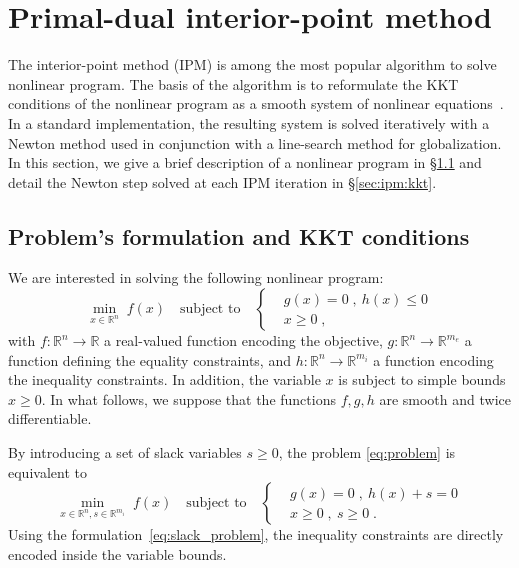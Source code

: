 \section{Primal-dual interior-point method}
The interior-point method (IPM) is among the most popular algorithm
to solve nonlinear program. The basis of the algorithm is to
reformulate the KKT conditions of the nonlinear program as a smooth
system of nonlinear equations~\cite{nocedal_numerical_2006}. In a standard implementation, the
resulting system is solved iteratively with a Newton method used in conjunction
with a line-search method for globalization. In this section, we
give a brief description of a nonlinear program in \S\ref{sec:ipm:problem}
and detail the Newton step solved at each IPM iteration in \S\ref{sec:ipm:kkt}.

\subsection{Problem's formulation and KKT conditions}
\label{sec:ipm:problem}
We are interested in solving the following nonlinear program:
\begin{equation}
  \label{eq:problem}
    \min_{x \in \mathbb{R}^n} \;  f(x)
\quad \text{subject to}\quad
\left\{
  \begin{aligned}
    & g(x) = 0 \; , ~ h(x) \leq 0 \\
      & x \geq 0  \; ,
  \end{aligned}
\right.
\end{equation}
with $f:\mathbb{R}^n \to \mathbb{R}$ a real-valued function
encoding the objective, $g: \mathbb{R}^n \to \mathbb{R}^{m_e}$
a function defining the equality constraints, and $h: \mathbb{R}^{n} \to
\mathbb{R}^{m_i}$ a function encoding the inequality constraints.
In addition, the variable $x$ is subject to simple bounds $x \geq 0$.
In what follows, we suppose that the functions $f, g, h$ are smooth
and twice differentiable.

By introducing a set of slack variables $s \geq 0$, the problem
\eqref{eq:problem} is equivalent to
\begin{equation}
  \label{eq:slack_problem}
    \min_{x \in \mathbb{R}^n, s \in \mathbb{R}^{m_i}} \;  f(x)
    \quad \text{subject to} \quad
    \left\{
  \begin{aligned}
    & g(x) = 0 \; , ~ h(x) + s = 0 \\
      & x \geq 0  \; , ~ s \geq 0  \; .
  \end{aligned}
  \right.
\end{equation}
Using the formulation~\eqref{eq:slack_problem}, the inequality constraints
are directly encoded inside the variable bounds.

